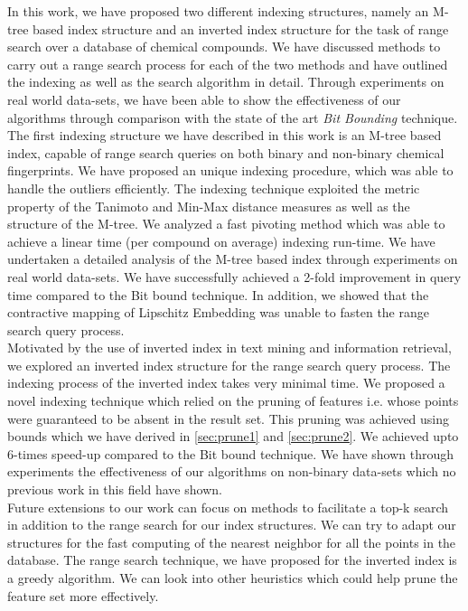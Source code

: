 %
%
In this work, we have proposed two different indexing structures, namely an M-tree based index structure and an inverted index structure for the task of range search over a database of chemical compounds. We have discussed methods to carry out a range search process for each of the two methods and have outlined the indexing as well as the search algorithm in detail. Through experiments on real world data-sets, we have been able to show the effectiveness of our algorithms through comparison with the state of the art\textit{ Bit Bounding} technique.\\

The first indexing structure we have described in this work is an  M-tree based index, capable of range search queries on both binary and non-binary chemical fingerprints. We have proposed an unique indexing procedure, which was able to handle the outliers efficiently. The indexing technique exploited the metric property of the Tanimoto and Min-Max distance measures as well as the structure of the M-tree. We analyzed a fast pivoting method which was able to achieve a linear time (per compound on average) indexing run-time. We have undertaken a detailed analysis of the M-tree based index through experiments on real world data-sets. We have successfully achieved a 2-fold improvement in query time compared to the Bit bound technique. In addition, we showed that the contractive mapping of Lipschitz Embedding was unable to fasten the range search query process. \\

Motivated by the use of inverted index in text mining and information retrieval, we explored an inverted index structure for the range search query process. The indexing process of the inverted index takes very minimal time. We proposed a novel indexing technique which relied on the pruning of features i.e. whose points were guaranteed to be absent in the result set. This pruning was achieved using bounds which we have derived in \autoref{sec:prune1} and \autoref{sec:prune2}. We achieved upto 6-times speed-up compared to the Bit bound technique. We have shown through experiments the effectiveness of our algorithms on non-binary data-sets which no previous work in this field have shown. \\
 
Future extensions to our work can focus on methods to facilitate a top-k search in addition to the range search for our index structures. We can try to adapt our structures for the fast computing of the nearest neighbor for all the points in the database. The range search technique, we have proposed for the inverted index is a greedy algorithm. We can look into other heuristics which could help prune the feature set more effectively. \\

